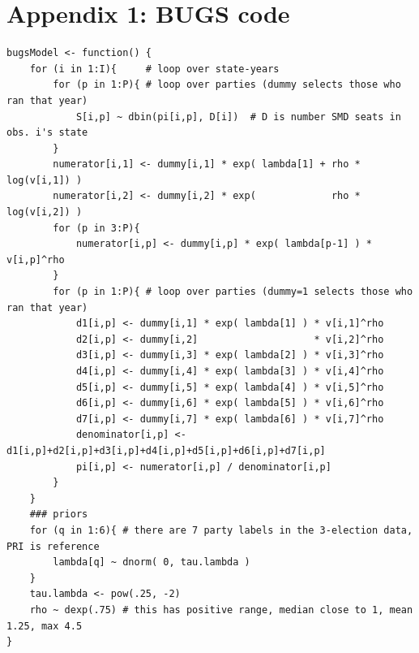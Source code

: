 \documentclass[letter,12pt]{article}
\begin{document}

\section*{Appendix 1: BUGS code}

\singlespacing

\begin{scriptsize}
\begin{verbatim}
bugsModel <- function() {
    for (i in 1:I){     # loop over state-years
        for (p in 1:P){ # loop over parties (dummy selects those who ran that year) 
            S[i,p] ~ dbin(pi[i,p], D[i])  # D is number SMD seats in obs. i's state
        }
        numerator[i,1] <- dummy[i,1] * exp( lambda[1] + rho * log(v[i,1]) )
        numerator[i,2] <- dummy[i,2] * exp(             rho * log(v[i,2]) )
        for (p in 3:P){
            numerator[i,p] <- dummy[i,p] * exp( lambda[p-1] ) * v[i,p]^rho
        }
        for (p in 1:P){ # loop over parties (dummy=1 selects those who ran that year) 
            d1[i,p] <- dummy[i,1] * exp( lambda[1] ) * v[i,1]^rho 
            d2[i,p] <- dummy[i,2]                    * v[i,2]^rho 
            d3[i,p] <- dummy[i,3] * exp( lambda[2] ) * v[i,3]^rho 
            d4[i,p] <- dummy[i,4] * exp( lambda[3] ) * v[i,4]^rho 
            d5[i,p] <- dummy[i,5] * exp( lambda[4] ) * v[i,5]^rho 
            d6[i,p] <- dummy[i,6] * exp( lambda[5] ) * v[i,6]^rho 
            d7[i,p] <- dummy[i,7] * exp( lambda[6] ) * v[i,7]^rho 
            denominator[i,p] <- d1[i,p]+d2[i,p]+d3[i,p]+d4[i,p]+d5[i,p]+d6[i,p]+d7[i,p]
            pi[i,p] <- numerator[i,p] / denominator[i,p]
        }
    }
    ### priors
    for (q in 1:6){ # there are 7 party labels in the 3-election data, PRI is reference
        lambda[q] ~ dnorm( 0, tau.lambda )
    }
    tau.lambda <- pow(.25, -2)
    rho ~ dexp(.75) # this has positive range, median close to 1, mean 1.25, max 4.5
}
\end{verbatim}
\end{scriptsize}

\onehalfspacing



%


\end{document}
